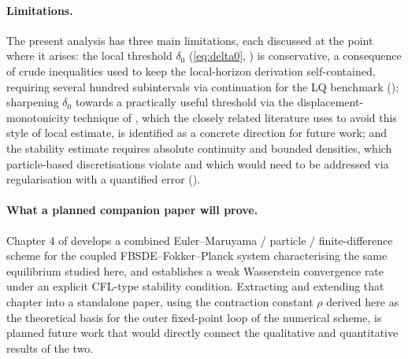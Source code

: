\documentclass[11pt]{article}
\theoremstyle{remark}
\begin{document}
\paragraph{Limitations.} The present analysis has three main limitations, each
discussed at the point where it arises: the local threshold $\delta_0$
(\eqref{eq:delta0}, ) is conservative, a consequence of crude
inequalities used to keep the local-horizon derivation self-contained, requiring
several hundred subintervals via continuation for the LQ benchmark
(); sharpening $\delta_0$ towards a practically useful
threshold via the displacement-monotonicity technique of
\citet{jacksontangpi2024,jacksonmeszaros2025}, which the closely related literature
uses to avoid this style of local estimate, is identified as a concrete direction
for future work; and the stability estimate requires absolute continuity and
bounded densities, which particle-based discretisations violate and which would
need to be addressed via regularisation with a quantified error
().

\paragraph{What a planned companion paper will prove.} Chapter 4 of
\citet{monyimba2026thesis} develops a combined
Euler--Maruyama / particle / finite-difference scheme for the coupled
FBSDE--Fokker--Planck system characterising the same equilibrium studied here, and
establishes a weak Wasserstein convergence rate under an explicit CFL-type
stability condition. Extracting and extending that chapter into a standalone paper,
using the contraction constant $\rho$ derived here as the theoretical basis for
the outer fixed-point loop of the numerical scheme, is planned future work that
would directly connect the qualitative and quantitative results of the two.
\end{document}
